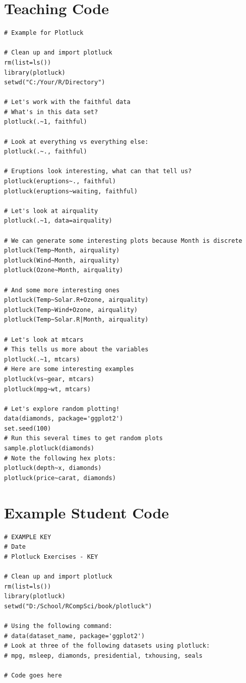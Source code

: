 \section{Teaching Code}
\begin{lstlisting}
# Example for Plotluck

# Clean up and import plotluck
rm(list=ls())
library(plotluck)
setwd("C:/Your/R/Directory")

# Let's work with the faithful data
# What's in this data set?
plotluck(.~1, faithful)

# Look at everything vs everything else:
plotluck(.~., faithful)

# Eruptions look interesting, what can that tell us?
plotluck(eruptions~., faithful)
plotluck(eruptions~waiting, faithful)

# Let's look at airquality
plotluck(.~1, data=airquality)

# We can generate some interesting plots because Month is discrete
plotluck(Temp~Month, airquality)
plotluck(Wind~Month, airquality)
plotluck(Ozone~Month, airquality)

# And some more interesting ones
plotluck(Temp~Solar.R+Ozone, airquality)
plotluck(Temp~Wind+Ozone, airquality)
plotluck(Temp~Solar.R|Month, airquality)

# Let's look at mtcars
# This tells us more about the variables
plotluck(.~1, mtcars)
# Here are some interesting examples
plotluck(vs~gear, mtcars)
plotluck(mpg~wt, mtcars)

# Let's explore random plotting!
data(diamonds, package='ggplot2')
set.seed(100)
# Run this several times to get random plots
sample.plotluck(diamonds)
# Note the following hex plots:
plotluck(depth~x, diamonds)
plotluck(price~carat, diamonds)

\end{lstlisting}

\section{Example Student Code}
\begin{lstlisting}
# EXAMPLE KEY
# Date
# Plotluck Exercises - KEY

# Clean up and import plotluck
rm(list=ls())
library(plotluck)
setwd("D:/School/RCompSci/book/plotluck")

# Using the following command:
# data(dataset_name, package='ggplot2')
# Look at three of the following datasets using plotluck:
# mpg, msleep, diamonds, presidential, txhousing, seals

# Code goes here
\end{lstlisting}

